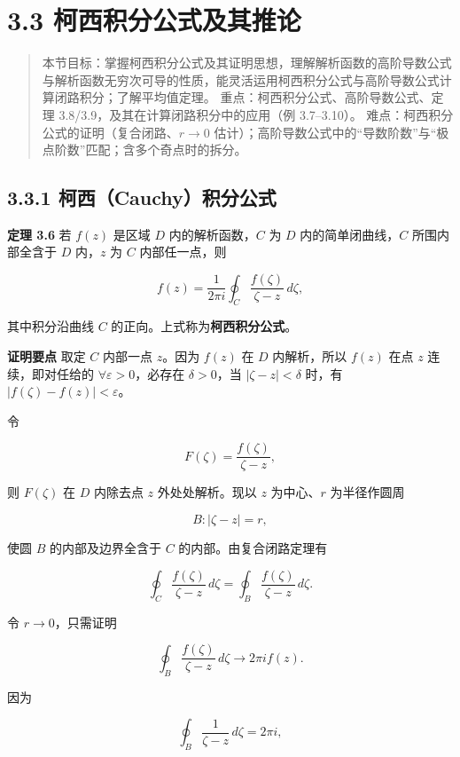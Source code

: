 \section{3.3
柯西积分公式及其推论}\label{ux67efux897fux79efux5206ux516cux5f0fux53caux5176ux63a8ux8bba}

\begin{quote}
本节目标：掌握柯西积分公式及其证明思想，理解解析函数的高阶导数公式与解析函数无穷次可导的性质，能灵活运用柯西积分公式与高阶导数公式计算闭路积分；了解平均值定理。
重点：柯西积分公式、高阶导数公式、定理
3.8/3.9，及其在计算闭路积分中的应用（例 3.7--3.10）。
难点：柯西积分公式的证明（复合闭路、\(r\to0\)
估计）；高阶导数公式中的``导数阶数''与``极点阶数''匹配；含多个奇点时的拆分。
\end{quote}

\subsection{3.3.1
柯西（Cauchy）积分公式}\label{ux67efux897fcauchyux79efux5206ux516cux5f0f}

\textbf{定理 3.6} 若 \(f(z)\) 是区域 \(D\) 内的解析函数，\(C\) 为 \(D\)
内的简单闭曲线，\(C\) 所围内部全含于 \(D\) 内，\(z\) 为 \(C\)
内部任一点，则

\[
f(z)=\frac{1}{2\pi i}\oint_C\frac{f(\zeta)}{\zeta-z}\,d\zeta,
\]

其中积分沿曲线 \(C\) 的正向。上式称为\textbf{柯西积分公式}。

\textbf{证明要点} 取定 \(C\) 内部一点 \(z\)。因为 \(f(z)\) 在 \(D\)
内解析，所以 \(f(z)\) 在点 \(z\) 连续，即对任给的
\(\forall\varepsilon>0\)，必存在 \(\delta>0\)，当 \(|\zeta-z|<\delta\)
时，有 \(|f(\zeta)-f(z)|<\varepsilon\)。

令

\[
F(\zeta)=\frac{f(\zeta)}{\zeta-z},
\]

则 \(F(\zeta)\) 在 \(D\) 内除去点 \(z\) 外处处解析。现以 \(z\)
为中心、\(r\) 为半径作圆周

\[
B:|\zeta-z|=r,
\]

使圆 \(B\) 的内部及边界全含于 \(C\) 的内部。由复合闭路定理有

\[
\oint_C\frac{f(\zeta)}{\zeta-z}\,d\zeta=\oint_B\frac{f(\zeta)}{\zeta-z}\,d\zeta .
\]

令 \(r\to0\)，只需证明

\[
\oint_B\frac{f(\zeta)}{\zeta-z}\,d\zeta\to2\pi i f(z) .
\]

因为

\[
\oint_B\frac{1}{\zeta-z}\,d\zeta=2\pi i ,
\]

